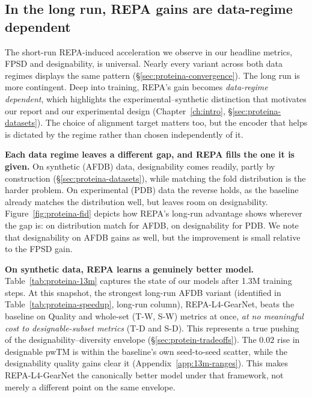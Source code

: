 \documentclass[12pt,a4paper,twoside]{report}
\begin{document}
\subsection{In the long run, REPA gains are data-regime dependent}
\label{sec:proteina-distribution}
\label{sec:proteina-anatomy}
\label{sec:proteina-modulation}

The short-run REPA-induced acceleration we observe in our headline metrics, FPSD and designability, is universal. Nearly every variant across both data regimes displays the same pattern (\S\ref{sec:proteina-convergence}). The long run is more contingent. Deep into training, REPA's gain becomes \emph{data-regime dependent}, which highlights the experimental--synthetic distinction that motivates our report and our experimental design (Chapter~\ref{ch:intro}, \S\ref{sec:proteina-datasets}). The choice of alignment target matters too, but the encoder that helps is dictated by the regime rather than chosen independently of it.

\textbf{Each data regime leaves a different gap, and REPA fills the one it is given.} On synthetic (AFDB) data, designability comes readily, partly by construction (\S\ref{sec:proteina-datasets}), while matching the fold distribution is the harder problem. On experimental (PDB) data the reverse holds, as the baseline already matches the distribution well, but leaves room on designability. Figure~\ref{fig:proteina-fid} depicts how REPA's long-run advantage shows wherever the gap is: on distribution match for AFDB, on designability for PDB. We note that designability on AFDB gains as well, but the improvement is small relative to the FPSD gain.



\textbf{On synthetic data, REPA learns a genuinely better model.} Table~\ref{tab:proteina-13m} captures the state of our models after 1.3M training steps. At this snapshot, the strongest long-run AFDB variant (identified in Table~\ref{tab:proteina-speedup}, long-run column), REPA-L4-GearNet, beats the baseline on Quality and whole-set (T-W, S-W) metrics at once, \emph{at no meaningful cost to designable-subset metrics} (T-D and S-D). This represents a true pushing of the designability--diversity envelope (\S\ref{sec:protein-tradeoffs}). The $0.02$ rise in designable pwTM is within the baseline's own seed-to-seed scatter, while the designability quality gains clear it (Appendix~\ref{app:13m-ranges}). This makes REPA-L4-GearNet the canonically better model under that framework, not merely a different point on the same envelope.
\end{document}
